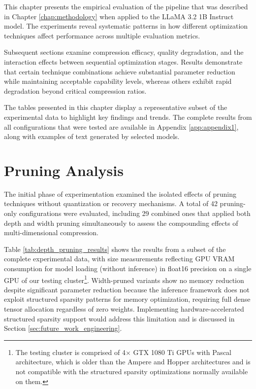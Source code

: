 
This chapter presents the empirical evaluation of the pipeline that was described in Chapter \ref{chap:methodology} when applied to the LLaMA 3.2 1B Instruct model. The experiments reveal systematic patterns in how different optimization techniques affect performance across multiple evaluation metrics.

Subsequent sections examine compression efficacy, quality degradation, and the interaction effects between sequential optimization stages. Results demonstrate that certain technique combinations achieve substantial parameter reduction while maintaining acceptable capability levels, whereas others exhibit rapid degradation beyond critical compression ratios.

The tables presented in this chapter display a representative subset of the experimental data to highlight key findings and trends. The complete results from all configurations that were tested are available in Appendix \ref{app:appendix1}, along with examples of text generated by selected models.

\section{Pruning Analysis} \label{sec:pruning_analysis}

The initial phase of experimentation examined the isolated effects of pruning techniques without quantization or recovery mechanisms. A total of 42 pruning-only configurations were evaluated, including 29 combined ones that applied both depth and width pruning simultaneously to assess the compounding effects of multi-dimensional compression.

Table \ref{tab:depth_pruning_results} shows the results from a subset of the complete experimental data, with size measurements reflecting GPU VRAM consumption for model loading (without inference) in float16 precision on a single GPU of our testing cluster\footnote{The testing cluster is comprised of 4$\times$ GTX 1080 Ti GPUs with Pascal architecture, which is older than the Ampere and Hopper architectures and is not compatible with the structured sparsity optimizations normally available on them.}. Width-pruned variants show no memory reduction despite significant parameter reduction because the inference framework does not exploit structured sparsity patterns for memory optimization, requiring full dense tensor allocation regardless of zero weights. Implementing hardware-accelerated structured sparsity support would address this limitation and is discussed in Section \ref{sec:future_work_engineering}.

